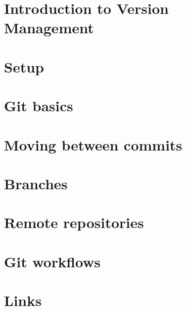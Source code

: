 \documentclass[b5paper,openany]{book}
\begin{document}
\tp


\tableofcontents



\chapter{Introduction to Version Management}


\chapter{Setup}


\chapter{Git basics}


\chapter{Moving between commits}


\chapter{Branches}


\chapter{Remote repositories}


\chapter{Git workflows}


\chapter{Links}





\end{document}
